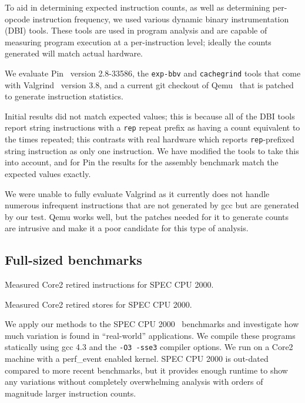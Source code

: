 To aid in determining expected instruction counts, as well as 
determining per-opcode instruction frequency, we 
used various dynamic binary 
instrumentation (DBI) tools.  
These tools are used in program 
analysis and are capable of measuring program execution at a per-instruction
level; ideally the counts generated will match actual hardware.

We evaluate Pin~\cite{luk+:pldi05} version 2.8-33586,
the {\tt exp-bbv} and {\tt cachegrind} tools that come
with Valgrind~\cite{nethercote+:pldi07} version 3.8, 
and a current git checkout of Qemu~\cite{bellard:usenix2005}
that is patched to generate instruction statistics.      

Initial results did not match expected values; this is
because all of the DBI tools report string instructions with
a {\tt rep} repeat prefix as
having a count equivalent to the times repeated; this contrasts
with real hardware which reports {\tt rep}-prefixed string instruction as 
only one instruction.
We have modified the tools to take this into account, and for 
Pin the results for the assembly benchmark match the expected
values exactly.  

We were unable to fully
evaluate Valgrind as it currently does not handle numerous
infrequent instructions that are not generated by gcc 
but are generated by our test.  
Qemu works well,
but the patches needed for it to generate counts are intrusive and
make it a poor candidate for this type of analysis.

%
%

\subsection{Full-sized benchmarks}


\begin{table*}[!htbp]
\caption{Measured Core2 retired instructions for SPEC CPU 2000.}
\label{table:spec2k_instructions}
\centering

\end{table*}


\begin{table*}[!htbp]
\caption{Measured Core2 retired stores for SPEC CPU 2000.}
\label{table:spec2k_stores}
\centering

\end{table*}

We apply our methods to the SPEC CPU 2000~\cite{spec:cpu00} benchmarks
and investigate how much variation is found in ``real-world''
applications.  We compile these programs statically
using gcc 4.3 and the {\tt -O3 -sse3} compiler options.
We run on a Core2 machine with a perf\_event enabled kernel.
SPEC CPU 2000 is out-dated compared to more recent benchmarks, but
it provides enough runtime to show any variations without 
completely overwhelming analysis with orders of magnitude larger
instruction counts.

